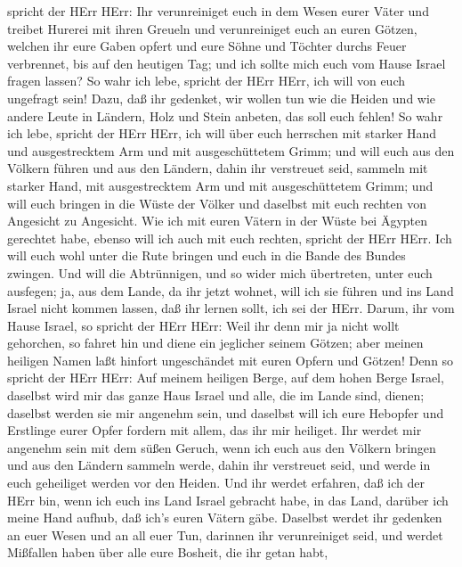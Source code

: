 spricht der HErr HErr: Ihr verunreiniget euch in dem Wesen eurer Väter
und treibet Hurerei mit ihren Greueln  und verunreiniget
euch an euren Götzen, welchen ihr eure Gaben opfert und eure Söhne und
Töchter durchs Feuer verbrennet, bis auf den heutigen Tag; und ich
sollte mich euch vom Hause Israel fragen lassen? So wahr ich lebe,
spricht der HErr HErr, ich will von euch ungefragt sein! 
Dazu, daß ihr gedenket, wir wollen tun wie die Heiden und wie andere
Leute in Ländern, Holz und Stein anbeten, das soll euch fehlen!
 So wahr ich lebe, spricht der HErr HErr, ich will über
euch herrschen mit starker Hand und ausgestrecktem Arm und mit
ausgeschüttetem Grimm;  und will euch aus den Völkern
führen und aus den Ländern, dahin ihr verstreuet seid, sammeln mit
starker Hand, mit ausgestrecktem Arm und mit ausgeschüttetem Grimm;
 und will euch bringen in die Wüste der Völker und daselbst
mit euch rechten von Angesicht zu Angesicht.  Wie ich mit
euren Vätern in der Wüste bei Ägypten gerechtet habe, ebenso will ich
auch mit euch rechten, spricht der HErr HErr.  Ich will
euch wohl unter die Rute bringen und euch in die Bande des Bundes
zwingen.  Und will die Abtrünnigen, und so wider mich
übertreten, unter euch ausfegen; ja, aus dem Lande, da ihr jetzt wohnet,
will ich sie führen und ins Land Israel nicht kommen lassen, daß ihr
lernen sollt, ich sei der HErr.  Darum, ihr vom Hause
Israel, so spricht der HErr HErr: Weil ihr denn mir ja nicht wollt
gehorchen, so fahret hin und diene ein jeglicher seinem Götzen; aber
meinen heiligen Namen laßt hinfort ungeschändet mit euren Opfern und
Götzen!  Denn so spricht der HErr HErr: Auf meinem heiligen
Berge, auf dem hohen Berge Israel, daselbst wird mir das ganze Haus
Israel und alle, die im Lande sind, dienen; daselbst werden sie mir
angenehm sein, und daselbst will ich eure Hebopfer und Erstlinge eurer
Opfer fordern mit allem, das ihr mir heiliget.  Ihr werdet
mir angenehm sein mit dem süßen Geruch, wenn ich euch aus den Völkern
bringen und aus den Ländern sammeln werde, dahin ihr verstreuet seid,
und werde in euch geheiliget werden vor den Heiden.  Und
ihr werdet erfahren, daß ich der HErr bin, wenn ich euch ins Land Israel
gebracht habe, in das Land, darüber ich meine Hand aufhub, daß ich's
euren Vätern gäbe.  Daselbst werdet ihr gedenken an euer
Wesen und an all euer Tun, darinnen ihr verunreiniget seid, und werdet
Mißfallen haben über alle eure Bosheit, die ihr getan habt,

